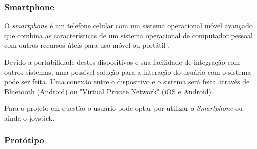 \subsubsection{Smartphone}
O \textit{smartphone} é um telefone celular com um sistema operacional móvel avançado que combina as características de um sistema operacional de computador pessoal com outros recursos úteis para uso móvel ou portátil \cite{article_smartphone}.

Devido a portabilidade destes dispositivos e sua facilidade de integração com outros sistemas, uma possível solução para a interação do usuário com o sistema pode ser feita. Uma conexão entre o dispositivo e o sistema será feita através de Bluetooth (Android) ou "Virtual Private Network" (iOS e Android).

Para o projeto em questão o usuário pode optar por utilizar o \textit{Smartphone} ou ainda o joystick.

\subsubsection{Protótipo}

